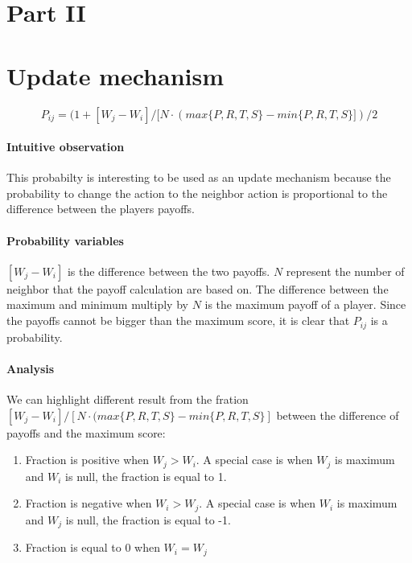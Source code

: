 \documentclass[letterpaper]{article}
\begin{document}
\section{Part II}

\section{Update mechanism}

\begin{equation}
    P_{ij} = (1 + [W_j - W_i] / [N\cdot(max\{P, R, T, S\}
    - min\{P, R, T, S\}])/2
\end{equation}

\paragraph{Intuitive observation}

This probabilty is interesting to be used as an update mechanism because
the probability to change the action to the neighbor action is
proportional to the difference between the players payoffs.

\paragraph{Probability variables}

$[W_j - W_i]$ is the difference between the two payoffs.
$N$ represent the number
of neighbor that the payoff calculation are based on. The difference
between the maximum and minimum multiply by $N$ is
the maximum payoff of a player. Since the payoffs cannot be bigger than
the maximum score, it is clear that $P_{ij}$ is a probability.

\paragraph{Analysis}

We can highlight different result from
the fration
$[W_j - W_i] / [N\cdot(max\{P, R, T, S\}
- min\{P, R, T, S\}]$
between the difference of payoffs and the maximum score:

\begin{enumerate}
    \item Fraction is positive when $W_j > W_i$. A special
    case is when $W_j$ is maximum and $W_i$ is null, the fraction is equal to 1.
    \item Fraction is negative when $W_i > W_j$. A special
    case is when $W_i$ is maximum and $W_j$ is null, the fraction is equal to -1.
    \item Fraction is equal to 0 when $W_i = W_j$
\end{enumerate}
\end{document}
